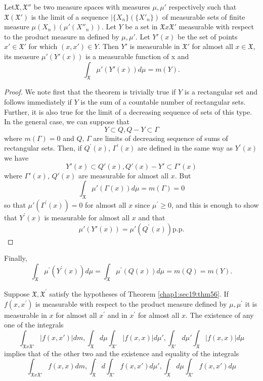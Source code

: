 \begin{theorem}\label{chap1:sec19:thm56}
Let\pageoriginale $ \mathfrak{X} ,
  \mathfrak{X}''$ be two measure spaces with measures $\mu ,
  \mu'$ respectively such that $\mathfrak{X}  (\mathfrak{X}')$ is
  the limit of a sequence $| \big \{ X_n\big\} (\big\{ X'_n\big\})$ of
  measurable sets of finite measure $\mu (X_n) (\mu' (X''_n))$.
  Let $Y$ be  a set in $\mathfrak{X} x \mathfrak{X}'$ measurable with
  respect to the product measure m defined by $\mu , \mu'$. Let
  $Y'(x)$ be the set of points $x'\in \mathfrak{X}'$ for
  which $(x, x')\in Y$. Then $Y'$ is measurable in
  $\mathfrak{X}'$ for almost all $x\in \mathfrak{X}$, its measure
  $\mu'(Y'(x))$ is a measurable function of x and 
  $$ 
  \int_{\mathfrak{X}} \mu' (Y'(x)) d \mu = m (Y). 
  $$
\end{theorem}

\begin{proof}
We note first that the theorem is
  trivially true if $Y$ is a rectangular set and follows immediately if
  $Y$ is the sum of a countable number of rectangular sets. Further, it
  is also true for the limit of a decreasing sequence of sets of this
  type. In the general case, we can suppose that 
  $$ 
  Y\subset Q, Q - Y \subset \Gamma 
  $$
  where $m(\Gamma)=0$ and $Q$, $\Gamma$ are limits of decreasing sequence
  of sums of rectangular sets. Then, if $Q^{'}(x)$, $\Gamma^{'} (x)$ are
  defined in the same way as $Y^{'}(x)$ we have 
  $$ 
  Y'(x) \subset Q'(x), Q'(x)-Y'\subset \Gamma'(x)
  $$
  where $\Gamma' (x)$, $Q'(x)$ are measurable for almost all $x$. But
  $$ 
  \int_{\mathfrak{X}} \mu'(\Gamma(x)) d \mu = m (\Gamma)=0 
  $$
  so that $\mu'(\Gamma^{'}(x))=0$ for almost all $x$ since $\mu^{'} \ge
  0$, and this is enough to show that $Y^{'}(x)$ is measurable for
  almost all $x$ and that 
  $$ 
  \mu'(Y'(x)) = \mu' (Q^{'}(x)) \text{p.p.} 
  $$
\end{proof}

Finally,\pageoriginale
$$ 
\int_{\mathfrak{X}} \mu^{'}(Y^{'}(x))d\mu =
\int_{\mathfrak{X}}\mu^{'}(Q(x)) d\mu = m(Q) = m (Y).
$$
\begin{theorem}\label{chap1:sec19:thm57} 
  Suppose $\mathfrak{X}, \mathfrak{X}^{'}$ satisfy
  the hypotheses of Theorem \ref{chap1:sec19:thm56}. If $f(x,x^{'})$
  is measurable with 
      respect to the product measure defined by $\mu , \mu^{'}$ it is
      measurable in $x$ for almost all $x^{'}$ and in $x^{'}$ for almost
      all $x$. The existence of any one of the integrals 
      $$ 
      \int_{\mathfrak{X}x  \mathfrak{X}'} |f(x,x')| dm ,
      \int_{\mathfrak{X}} d \mu \int_{\mathfrak{X}'} |f(x,x)| d\mu',
      \int_{\mathfrak{X}'}d \mu' \int_{\mathfrak{X}}|f(x,x)|d\mu 
      $$
      implies that of the other two and the existence and equality of
      the integrals 
      $$ 
      \int_{\mathfrak{X} x \mathfrak{X}'} f(x,x) dm ,
      \int_{\mathfrak{X}} d \int_{\mathfrak{X}'} f(x,x') d \mu',
      \int_{\mathfrak{X}} d\mu \int_{\mathfrak{X}'} f(x, x') d \mu 
      $$
\end{theorem}

